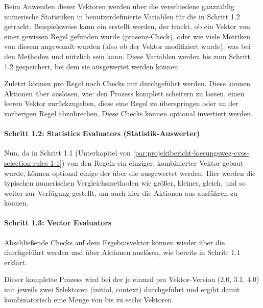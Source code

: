 Beim Anwenden dieser Vektoren werden über die  verschiedene ganzzahlig numerische Statistiken in benutzerdefinierte Variablen für die  in Schritt 1.2 getrackt.
Beispielsweise kann ein  erstellt werden, der trackt, ob ein Vektor von einer gewissen Regel gefunden wurde (präsenz-Check), oder wie viele Metriken von diesem angewandt wurden (also ob der Vektor modifiziert wurde), was bei den Methoden  und  nützlich sein kann.
Diese Variablen werden bis zum Schritt 1.2 gespeichert, bei dem sie ausgewertet werden können.

Zuletzt können pro Regel noch Checks mit  durchgeführt werden.
Diese können Aktionen über  auslösen, wie:
den Prozess komplett scheitern zu lassen, einen leeren Vektor zurückzugeben, diese eine Regel zu überspringen oder an der vorherigen Regel abzubrechen.
Diese Checks können optional invertiert werden.

\paragraph{Schritt 1.2: Statistics Evaluators (Statistik-Auswerter)}

Nun, da in Schritt 1.1 (Unterkapitel von \ref{par:projektbericht-loesungsweg-cvss-selection-rules-1-1}) von den Regeln ein einziger, kombinierter Vektor gebaut wurde, können optional einige der  über die  ausgewertet werden.
Hier werden die typischen numerischen Vergleichsmethoden wie größer, kleiner, gleich, und so weiter zur Verfügung gestellt, um auch hier die Aktionen aus  ausführen zu können.

\paragraph{Schritt 1.3: Vector Evaluators}

Abschließende Checks auf dem Ergebnisvektor können wieder über die  durchgeführt werden und über  Aktionen auslösen, wie bereits in Schritt 1.1 erklärt.

Dieser komplette Prozess wird bei der {\metaeffekt} je einmal pro Vektor-Version (2.0, 3.1, 4.0) mit jeweils zwei Selektoren (initial, context) durchgeführt und ergibt damit kombinatorisch eine Menge von bis zu sechs Vektoren.

